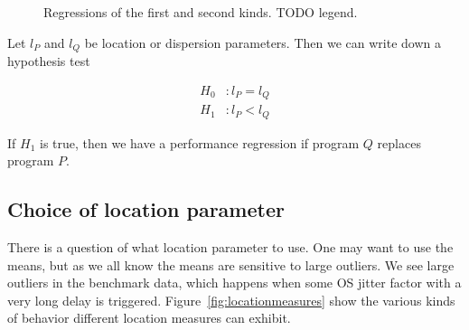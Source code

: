 \documentclass[conference]{IEEEtran}
\begin{document}
\begin{figure}
\caption{Regressions of the first and second kinds. TODO legend.}
\label{fig:regressionkinds}
\end{figure}

Let $l_P$ and $l_Q$ be location or dispersion parameters. Then we can write down a hypothesis test

\begin{subequations}
\begin{align}
H_0&: l_P = l_Q \\
H_1&: l_P < l_Q
\end{align}
\end{subequations}

If $H_1$ is true, then we have a performance regression if program $Q$ replaces program $P$.


\subsection{Choice of location parameter}

There is a question of what location parameter to use.
One may want to use the means, but as we all know the means are sensitive to large outliers. We see large outliers in the benchmark data, which happens when some OS jitter factor with a very long delay is triggered.
Figure~\ref{fig:locationmeasures} show the various kinds of behavior different location measures can exhibit.
\end{document}
